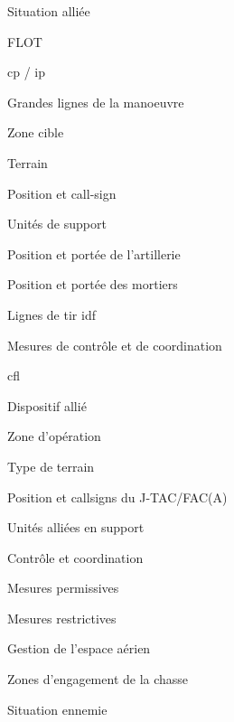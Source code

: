 \begin{e1}
    \item Situation alliée
    \begin{e2}
        \item FLOT
        \item \acrfull{cp} / \acrfull{ip}
        \item Grandes lignes de la manoeuvre
        \begin{e3}
            \item Zone cible
            \item Terrain
            \item Position et call-sign \ja{}
            \item Unités de support
            \begin{e4}
            	\item Position et portée de l'artillerie
            	\item Position et portée des mortiers
            	\item Lignes de tir \acrfull{idf}
            \end{e4}
            \item Mesures de contrôle et de coordination
            \begin{e4}
				\item \acrfull{cfl}            %
            \end{e4}
        \end{e3}
        \item Dispositif allié
        \begin{e3}
            \item Zone d’opération
            \item Type de terrain
            \item Position et callsigns du J-TAC/FAC(A)
            \item Unités alliées en support
        \end{e3}
        \item Contrôle et coordination
        \begin{e3}
            \item Mesures permissives
            \item Mesures restrictives
        \end{e3}
        \item Gestion de l’espace aérien
        \item Zones d’engagement de la chasse
    \end{e2}
    \item Situation ennemie

\end{e1}
